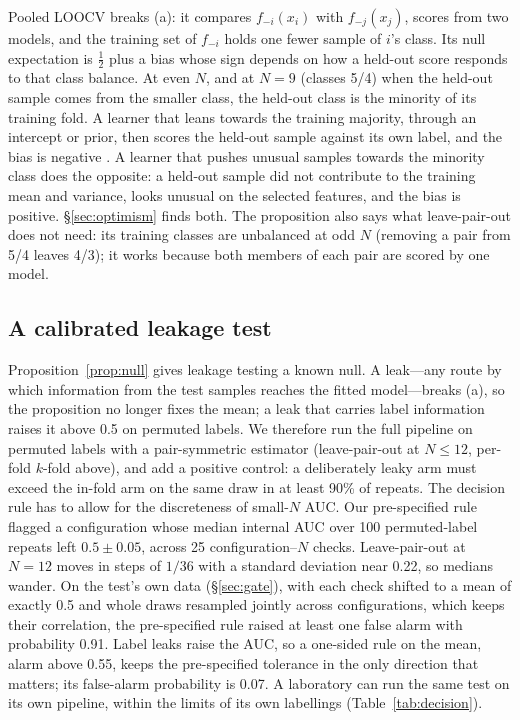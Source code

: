 \documentclass[10pt,letterpaper]{article}
\begin{document}
Pooled LOOCV breaks (a): it compares $f_{-i}(x_i)$ with $f_{-j}(x_j)$, scores from two models, and the
training set of $f_{-i}$ holds one fewer sample of $i$'s class. Its null expectation is $\tfrac12$ plus a
bias whose sign depends on how a held-out score responds to that class balance. At even $N$, and at $N = 9$
(classes 5/4) when the held-out sample comes from the smaller class, the held-out class is the minority of
its training fold. A learner that leans towards the training majority, through an intercept or prior, then
scores the held-out sample against its own label, and the bias is negative
\citep{parker2007stratification,airola2011auc}. A learner that pushes unusual samples towards the minority
class does the opposite: a held-out sample did not contribute to the training mean and variance, looks
unusual on the selected features, and the bias is positive. \S\ref{sec:optimism} finds both. The
proposition also says what leave-pair-out does not need: its training classes are unbalanced at odd $N$
(removing a pair from 5/4 leaves 4/3); it works because both members of each pair are scored by one model.

\subsection{A calibrated leakage test}\label{sec:leaktest}
Proposition~\ref{prop:null} gives leakage testing a known null. A leak---any route by which information from
the test samples reaches the fitted model---breaks (a), so the proposition no longer fixes the mean; a leak
that carries label information raises it above 0.5 on permuted labels. We therefore run the full pipeline on permuted labels with a pair-symmetric estimator
(leave-pair-out at $N \le 12$, per-fold $k$-fold above), and add a positive control: a deliberately leaky arm
must exceed the in-fold arm on the same draw in at least 90\% of repeats. The decision rule has to allow for
the discreteness of small-$N$ AUC. Our pre-specified rule flagged a configuration whose median internal AUC over
100 permuted-label repeats left $0.5 \pm 0.05$, across 25 configuration--$N$ checks. Leave-pair-out at
$N = 12$ moves in steps of $1/36$ with a standard deviation near 0.22, so medians wander. On the test's own
data (\S\ref{sec:gate}), with each check shifted to a mean of exactly 0.5 and whole draws resampled jointly
across configurations, which keeps their correlation, the pre-specified rule raised at least one false alarm
with probability 0.91. Label leaks raise the AUC, so a one-sided rule on the mean, alarm above 0.55, keeps the
pre-specified tolerance in the only direction that matters; its false-alarm probability is 0.07. A laboratory
can run the same test on its own pipeline, within the limits of its own labellings (Table~\ref{tab:decision}).
\end{document}
